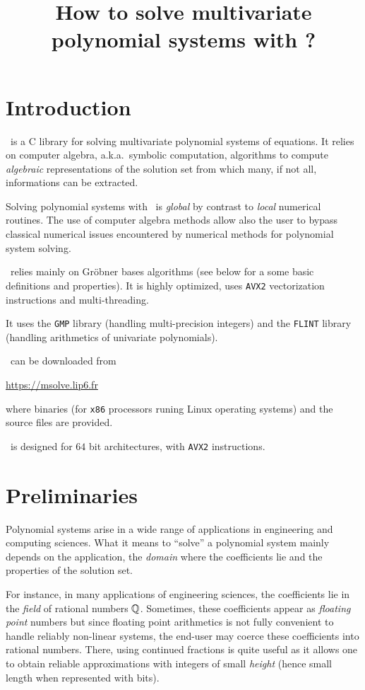 \documentclass[a4paper,english,11pt]{scrartcl}
\title{How to solve multivariate polynomial systems with {\msolve}?}
\date{}
\theoremstyle{definition}
\theoremstyle{remark}
\begin{document}
\maketitle

\tableofcontents

\section{Introduction}

\msolve~is a C library for solving multivariate polynomial systems of equations. 
It relies on computer algebra, a.k.a.\ symbolic computation, algorithms to
compute \emph{algebraic} representations of the solution set from which
many, if not all, informations can be extracted.

Solving polynomial systems with \msolve~is \emph{global} by contrast to
\emph{local} numerical routines. The use of computer algebra methods allow also
the user to bypass classical numerical issues encountered by numerical methods
for polynomial system solving.

\msolve~relies mainly on Gr\"obner bases algorithms (see below for a some basic
definitions and properties). It is highly optimized, uses \texttt{AVX2}
vectorization instructions and multi-threading.

It uses the \texttt{GMP} library (handling multi-precision integers) and the
\texttt{FLINT} library (handling arithmetics of univariate polynomials).

\msolve~can be downloaded from
\begin{center}
  \url{https://msolve.lip6.fr}
\end{center}
where binaries (for \texttt{x86} processors runing Linux operating systems) and
the source files are provided.

\msolve~is designed for $64$ bit architectures, with \texttt{AVX2} instructions. 

\section{Preliminaries}

Polynomial systems arise in a wide range of applications in engineering and
computing sciences. What it means to ``solve'' a polynomial system mainly
depends on the application, the \emph{domain} where the coefficients lie and the
properties of the solution set.

For instance, in many applications of engineering sciences, the coefficients lie
in the \emph{field} of rational numbers $\mathbb{Q}$. Sometimes, these coefficients
appear as \emph{floating point} numbers but since floating point arithmetics is
not fully convenient to handle reliably non-linear systems, the end-user may
coerce these coefficients into rational numbers. There, using continued
fractions is quite useful as it allows one to obtain reliable approximations
with integers of small \emph{height} (hence small length when represented with
bits). 
\end{document}
